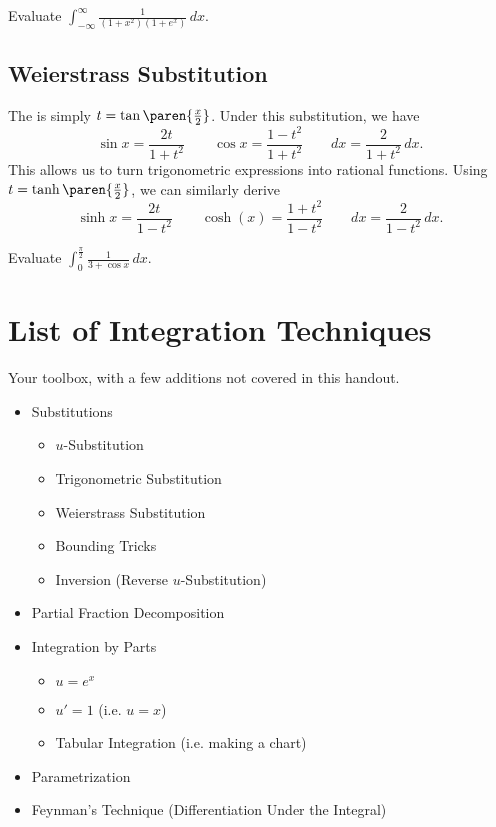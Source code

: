 \documentclass{article}
\begin{document}
\begin{exer}
Evaluate $\int_{-\infty}^{\infty} \frac{1}{(1+x^2)(1+e^x)}\,dx$.
\end{exer}

\subsection{Weierstrass Substitution}
The  is simply $t=\tan\paren{\frac{x}{2}}$. Under this substitution, we have
\[\sin x=\frac{2t}{1+t^2} \qquad \cos x=\frac{1-t^2}{1+t^2} \qquad dx=\frac{2}{1+t^2}\,dx.\]
This allows us to turn trigonometric expressions into rational functions. Using $t=\tanh\paren{\frac{x}{2}}$, we can similarly derive
\[\sinh x=\frac{2t}{1-t^2} \qquad \cosh(x)=\frac{1+t^2}{1-t^2} \qquad dx=\frac{2}{1-t^2}\,dx.\]

\begin{exer}
Evaluate $\int_0^{\frac{\pi}{2}} \frac{1}{3+\cos x}\,dx$.
\end{exer}

\section{List of Integration Techniques}
Your toolbox, with a few additions not covered in this handout.
\begin{itemize}
    \item Substitutions
    \begin{itemize}
        \item $u$-Substitution
        \item Trigonometric Substitution
        \item Weierstrass Substitution
        \item Bounding Tricks
        \item Inversion (Reverse $u$-Substitution)
    \end{itemize}
    \item Partial Fraction Decomposition
    \item Integration by Parts
    \begin{itemize}
        \item $u=e^x$
        \item $u'=1$ (i.e. $u=x$)
        \item Tabular Integration (i.e. making a chart)
    \end{itemize}
    \item Parametrization
    \item Feynman's Technique (Differentiation Under the Integral)
\end{itemize}
\end{document}

